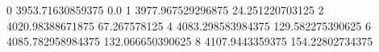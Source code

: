 0 3953.71630859375 0.0
1 3977.967529296875 24.251220703125
2 4020.98388671875 67.267578125
4 4083.298583984375 129.582275390625
6 4085.782958984375 132.066650390625
8 4107.9443359375 154.22802734375

